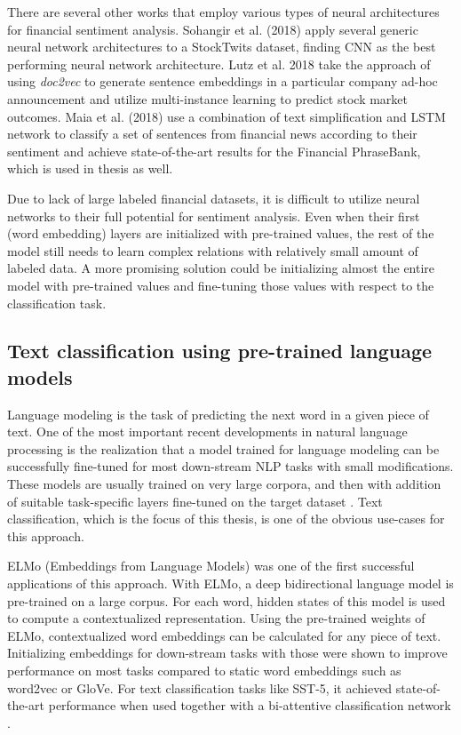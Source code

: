\documentclass[../main.tex]{subfiles}
\begin{document}
There are several other works that employ various types of neural architectures for financial sentiment analysis. Sohangir et al. (2018) \cite{Sohangir2018} apply several generic neural network architectures to a StockTwits dataset, finding CNN as the best performing neural network architecture. Lutz et al. 2018 \cite{Lutz2018} take the approach of using \textit{doc2vec} to generate sentence embeddings in a particular company ad-hoc announcement and utilize multi-instance learning to predict stock market outcomes. Maia et al. (2018) \cite{Maia20182} use a combination of text simplification and LSTM network to classify a set of sentences from financial news according to their sentiment and achieve state-of-the-art results for the Financial PhraseBank, which is used in thesis as well.

Due to lack of large labeled financial datasets, it is difficult to utilize neural networks to their full potential for sentiment analysis. Even when their first (word embedding) layers are initialized with pre-trained values, the rest of the model still needs to learn complex relations with relatively small amount of labeled data. A more promising solution could be initializing almost the entire model with pre-trained values and fine-tuning those values with respect to the classification task.

\subsection{Text classification using pre-trained language models} \label{text classification}

Language modeling is the task of predicting the next word in a given piece of text. One of the most important recent developments in natural language processing is the realization that a model trained for language modeling can be successfully fine-tuned for most down-stream NLP tasks with small modifications. These models are usually trained on very large corpora, and then with addition of suitable task-specific layers fine-tuned on the target dataset \cite{Kant2018}. Text classification, which is the focus of this thesis, is one of the obvious use-cases for this approach.

ELMo (Embeddings from Language Models) \cite{Peters2018} was one of the first successful applications of this approach. With ELMo, a deep bidirectional language model is pre-trained on a large corpus. For each word, hidden states of this model is used to compute a contextualized representation. Using the pre-trained weights of ELMo, contextualized word embeddings can be calculated for any piece of text. Initializing embeddings for down-stream tasks with those were shown to improve performance on most tasks compared to static word embeddings such as word2vec or GloVe. For text classification tasks like SST-5, it achieved state-of-the-art performance when used together with a bi-attentive classification network \cite{McCann2017}. 
\end{document}
